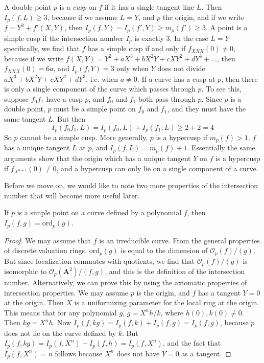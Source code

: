 \begin{example}
    A double point $p$ is a \emph{cusp} on $f$ if it has a single tangent line $L$. Then $I_p(f,L) \geq 3$, because if we assume $L = Y$, and $p$ the origin, and if we write $f = Y^2 + f'(X,Y)$, then $I_p(f,Y) = I_p(f',Y) \geq m_p(f') \geq 3$. A point is a simple cusp if the intersection number $I_p$ is exactly 3. In the case $L = Y$ specifically, we find that $f$ has a simple cusp if and only if $f_{XXX}(0) \neq 0$, because if we write $f(X,Y) = Y^2 + aX^3 + bX^2Y + cXY^2 + dY^3 + \dots$, then $f_{XXX}(0) = 6a$, and $I_p(f,Y) = 3$ only when $Y$ does not divide $aX^3 + bX^2Y + cXY^2 + dY^3$, i.e. when $a \neq 0$. If a curve has a cusp at $p$, then there is only a single component of the curve which passes through $p$. To see this, suppose $f_0f_1$ have a cusp $p$, and $f_0$ and $f_1$ both pass through $p$. Since $p$ is a double point, $p$ must be a simple point on $f_0$ and $f_1$, and they must have the same tangent $L$. But then
    \[ I_p(f_0f_1,L) = I_p(f_0,L) + I_p(f_1,L) \geq 2 + 2 = 4 \]
    So $p$ cannot be a simple cusp. More generally, $p$ is a hypercusp if $m_p(f) > 1$, $f$ has a unique tangent $L$ at $p$, and $I_p(f,L) = m_p(f) + 1$. Essentially the same arguments show that the origin which has a unique tangent $Y$ on $f$ is a hypercusp if $f_{X^{n+1}}(0) \neq 0$, and a hypercusp can only lie on a single component of a curve.
\end{example}

Before we move on, we would like to note two more properties of the intersection number that will become more useful later.

\begin{theorem}
    If $p$ is a simple point on a curve defined by a polynomial $f$, then $I_p(f,g) = \text{ord}_p(g)$.
\end{theorem}
\begin{proof}
    We may assume that $f$ is an irreducible curve. From the general properties of discrete valuation rings, $\text{ord}_p(g)$ is equal to the dimension of $\mathcal{O}_p(f)/(g)$. But since localization commutes with quotients, we find that $\mathcal{O}_p(f)/(g)$ is isomorphic to $\mathcal{O}_p(\mathbf{A}^2)/(f,g)$, and this is the definition of the intersection number. Alternatively, we can prove this by using the axiomatic properties of intersection properties. We may assume $p$ is the origin, and $f$ has a tangent $Y = 0$ at the origin. Then $X$ is a uniformizing parameter for the local ring at the origin. This means that for any polynomial $g$, $g = X^nh/k$, where $h(0), k(0) \neq 0$. Then $kg = X^nh$. Now $I_p(f,kg) = I_p(f,k) + I_p(f,g) = I_p(f,g)$, because $p$ does not lie on the curve defined by $k$. But $I_p(f,kg) = I_p(f,X^n) + I_p(f,h) = I_p(f,X^n)$, and the fact that $I_p(f,X^n) = n$ follows because $X^n$ does not have $Y = 0$ as a tangent.
\end{proof}


